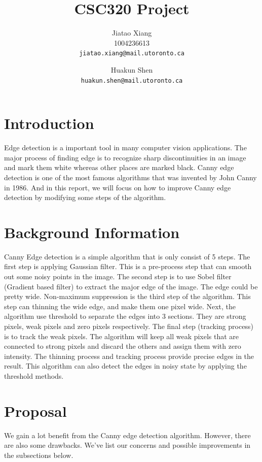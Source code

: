 \documentclass[10pt,twocolumn,letterpaper]{article}
\begin{document}
\title{CSC320 Project}

\author{Jiatao Xiang\\
1004236613\\
{\tt\small jiatao.xiang@mail.utoronto.ca}
\and
Huakun Shen\\
{\tt\small huakun.shen@mail.utoronto.ca}
}

\maketitle


\section{Introduction}
Edge detection is a important tool in many computer vision applications. The major process of finding edge is to recognize sharp discontinuities in an image and mark them white whereas other places are marked black. Canny edge detection is one of the most famous algorithms that was invented by John Canny in 1986. And in this report, we will focus on how to improve Canny edge detection by modifying some steps of the algorithm.\\


\section{Background Information}
Canny Edge detection is a simple algorithm that is only consist of 5 steps. The first step is applying Gaussian filter. This is a pre-process step that can smooth out some noisy points in the image. The second step is to use Sobel filter (Gradient based filter) to extract the major edge of the image. The edge could be pretty wide. Non-maximum suppression is the third step of the algorithm. This step can thinning the wide edge, and make them one pixel wide. Next, the algorithm use threshold to separate the edges into 3 sections. They are strong pixels, weak pixels and zero pixels respectively. The final step (tracking process) is to track the weak pixels. The algorithm will keep all weak pixels that are connected to strong pixels and discard the others and assign them with zero intensity. The thinning process and tracking process provide precise edges in the result. This algorithm can also detect the edges in noisy state by applying the threshold methods.

\section{Proposal}
We gain a lot benefit from the Canny edge detection algorithm. However, there are also some drawbacks. We've list our concerns and possible improvements in the subsections below.
\end{document}
